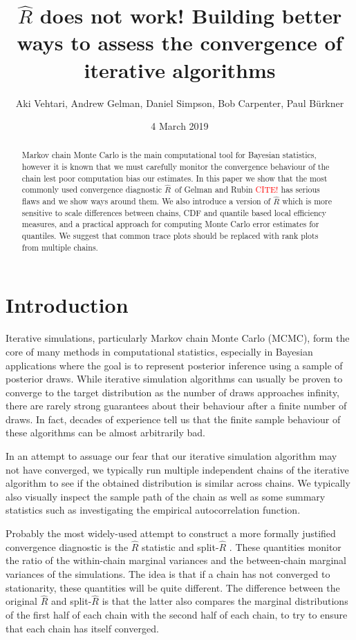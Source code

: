 \documentclass[american,]{article}
\title{$\widehat{R}$ does not work! Building better ways to assess the convergence of iterative algorithms}
\author{Aki Vehtari, Andrew Gelman, Daniel Simpson, Bob Carpenter, Paul Bürkner}
\date{4 March 2019}
\newcommand{\Rhat}{$\widehat{R}$}
\begin{document}
\maketitle
\begin{abstract}
  Markov chain Monte Carlo is the main computational tool for Bayesian 
  statistics, however it is known that we must carefully monitor the
  convergence behaviour of the chain lest poor computation bias our estimates.
In this paper we show that the most commonly used convergence diagnostic \Rhat\ 
of Gelman and Rubin \textcolor{red}{CITE!} has serious flaws and we
show ways around them.  We also introduce
  a version of $\widehat{R}$ which is more sensitive to scale
  differences between chains, CDF and quantile based local efficiency
  measures, and a practical approach for computing Monte Carlo error
  estimates for quantiles. We suggest that common trace plots should
  be replaced with rank plots from multiple chains.
\end{abstract}

\hypertarget{introduction}{%
\section{Introduction}\label{introduction}}

Iterative simulations, particularly Markov chain Monte Carlo (MCMC), form the core
of many methods in computational statistics, especially 
in Bayesian applications where the goal is to represent
posterior inference using a sample of posterior draws. While iterative
simulation algorithms can usually be proven to converge
to the target distribution as the number of draws approaches infinity,
there are rarely strong guarantees about their behaviour after a 
finite number of draws. In fact, decades of experience tell us that
the finite sample behaviour of these algorithms can be almost arbitrarily bad.


In an attempt to assuage our fear that our iterative simulation algorithm may
not have converged, we typically run multiple 
independent chains of the iterative algorithm to see if the obtained 
distribution is similar across chains.  We typically also visually inspect
the sample path of the chain as well as some summary statistics such as
investigating the empirical autocorrelation function. 

Probably the most widely-used attempt to construct a more formally justified 
convergence diagnostic  is the  \(\widehat{R}\) statistic
\citep{Gelman+Rubin:1992, Brooks+Gelman:1998} and
split-\(\widehat{R}\) \citep{BDA3}.  These quantities monitor the ratio of
the within-chain marginal variances and the between-chain marginal variances
of the simulations. The idea is that if a chain has not converged to 
stationarity, these quantities will be quite different.  The difference between
the original $\widehat{R}$ and split-$\widehat{R}$ is that the latter also compares 
the marginal distributions of the first half of each chain with the second
half of each chain, to try to ensure that each chain has itself converged.
\end{document}
